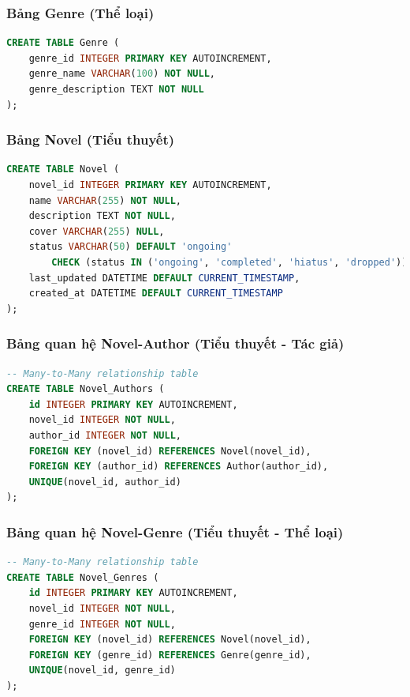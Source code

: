 \documentclass[12pt,aspectratio=169,handout]{beamer}
\begin{document}
\begin{frame}[fragile]
\frametitle{Bảng Genre (Thể loại)}
\begin{lstlisting}[language=SQL, basicstyle=\small\ttfamily]
CREATE TABLE Genre (
    genre_id INTEGER PRIMARY KEY AUTOINCREMENT,
    genre_name VARCHAR(100) NOT NULL,
    genre_description TEXT NOT NULL
);
\end{lstlisting}
\end{frame}

\begin{frame}
\frametitle{Bảng Novel (Tiểu thuyết)}
\begin{lstlisting}[language=SQL, basicstyle=\small\ttfamily]
CREATE TABLE Novel (
    novel_id INTEGER PRIMARY KEY AUTOINCREMENT,
    name VARCHAR(255) NOT NULL,
    description TEXT NOT NULL,
    cover VARCHAR(255) NULL,
    status VARCHAR(50) DEFAULT 'ongoing' 
        CHECK (status IN ('ongoing', 'completed', 'hiatus', 'dropped')),
    last_updated DATETIME DEFAULT CURRENT_TIMESTAMP,
    created_at DATETIME DEFAULT CURRENT_TIMESTAMP
);
\end{lstlisting}
\end{frame}

\begin{frame}[fragile]
\frametitle{Bảng quan hệ Novel-Author (Tiểu thuyết - Tác giả)}
\begin{lstlisting}[language=SQL, basicstyle=\small\ttfamily]
-- Many-to-Many relationship table
CREATE TABLE Novel_Authors (
    id INTEGER PRIMARY KEY AUTOINCREMENT,
    novel_id INTEGER NOT NULL,
    author_id INTEGER NOT NULL,
    FOREIGN KEY (novel_id) REFERENCES Novel(novel_id),
    FOREIGN KEY (author_id) REFERENCES Author(author_id),
    UNIQUE(novel_id, author_id)
);
\end{lstlisting}
\end{frame}

\begin{frame}[fragile]
\frametitle{Bảng quan hệ Novel-Genre (Tiểu thuyết - Thể loại)}
\begin{lstlisting}[language=SQL, basicstyle=\small\ttfamily]
-- Many-to-Many relationship table
CREATE TABLE Novel_Genres (
    id INTEGER PRIMARY KEY AUTOINCREMENT,
    novel_id INTEGER NOT NULL,
    genre_id INTEGER NOT NULL,
    FOREIGN KEY (novel_id) REFERENCES Novel(novel_id),
    FOREIGN KEY (genre_id) REFERENCES Genre(genre_id),
    UNIQUE(novel_id, genre_id)
);
\end{lstlisting}
\end{frame}
\end{document}
